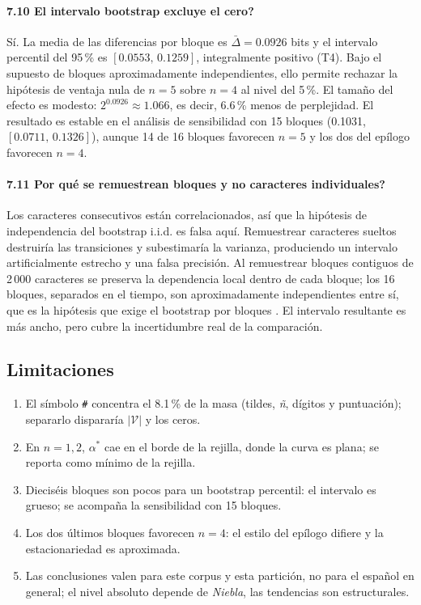 \documentclass[11pt,letterpaper]{article}
\begin{document}
\paragraph{7.10 \textquestiondown{}El intervalo bootstrap excluye el cero?}
Sí. La media de las diferencias por bloque es $\bar\Delta=0.0926$ bits y el intervalo percentil del 95\,\% es $[0.0553,\,0.1259]$, integralmente positivo (T4). Bajo el supuesto de bloques aproximadamente independientes, ello permite rechazar la hipótesis de ventaja nula de $n=5$ sobre $n=4$ al nivel del 5\,\%. El tamaño del efecto es modesto: $2^{0.0926}\approx1.066$, es decir, 6.6\,\% menos de perplejidad. El resultado es estable en el análisis de sensibilidad con 15 bloques (0.1031, $[0.0711,\,0.1326]$), aunque 14 de 16 bloques favorecen $n=5$ y los dos del epílogo favorecen $n=4$.

\paragraph{7.11 \textquestiondown{}Por qué se remuestrean bloques y no caracteres individuales?}
Los caracteres consecutivos están correlacionados, así que la hipótesis de independencia del bootstrap i.i.d. es falsa aquí. Remuestrear caracteres sueltos destruiría las transiciones y subestimaría la varianza, produciendo un intervalo artificialmente estrecho y una falsa precisión. Al remuestrear bloques contiguos de 2\,000 caracteres se preserva la dependencia local dentro de cada bloque; los 16 bloques, separados en el tiempo, son aproximadamente independientes entre sí, que es la hipótesis que exige el bootstrap por bloques \cite{efron}. El intervalo resultante es más ancho, pero cubre la incertidumbre real de la comparación.

\subsection{Limitaciones}
\begin{enumerate}[leftmargin=1.2em,itemsep=0pt]
\item El símbolo \texttt{\#} concentra el 8.1\,\% de la masa (tildes, \emph{ñ}, dígitos y puntuación); separarlo dispararía $|\mathcal{V}|$ y los ceros.
\item En $n=1,2$, $\alpha^*$ cae en el borde de la rejilla, donde la curva es plana; se reporta como mínimo de la rejilla.
\item Dieciséis bloques son pocos para un bootstrap percentil: el intervalo es grueso; se acompaña la sensibilidad con 15 bloques.
\item Los dos últimos bloques favorecen $n=4$: el estilo del epílogo difiere y la estacionariedad es aproximada.
\item Las conclusiones valen para este corpus y esta partición, no para el español en general; el nivel absoluto depende de \emph{Niebla}, las tendencias son estructurales.
\end{enumerate}
\end{document}

